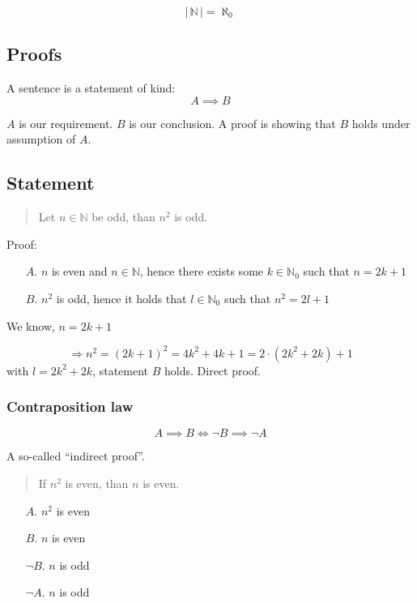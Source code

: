 \documentclass[a4paper,landscape,twocolumn]{article}
\newcommand\card[1]{\left|\,#1\,\right|}
\begin{document}
\[ \card{\mathbb{N}} = \aleph_0 \]

\subsection{Proofs}

A sentence is a statement of kind:
\[ A \implies B \]

$A$ is our requirement. $B$ is our conclusion.
A proof is showing that $B$ holds under assumption of $A$.

\subsection{Statement}

\begin{quote}
  Let $n \in \mathbb{N}$ be odd, than $n^2$ is odd.
\end{quote}

Proof:
\begin{itemize}
  \item[$A$.] $n$ is even and $n \in \mathbb{N}$, hence there exists some
           $k \in \mathbb{N}_0$ such that $n = 2k + 1$
  \item[$B$.] $n^2$ is odd, hence it holds that $l \in \mathbb{N}_0$ such that
           $n^2 = 2l + 1$
\end{itemize}

We know, $n = 2k + 1$

\[ \Rightarrow n^2 = (2k + 1)^2 = 4k^2 + 4k + 1 = 2\cdot(2k^2 + 2k) + 1 \]
with $l = 2k^2 + 2k$, statement $B$ holds. Direct proof.

\subsubsection{Contraposition law}

\[ A \implies B \Leftrightarrow \neg B \implies \neg A \]

A so-called \enquote{indirect proof}.

\begin{quote}
  If $n^2$ is even, than $n$ is even.
\end{quote}

\begin{itemize}
  \item[$A$.] $n^2$ is even
  \item[$B$.] $n$ is even
  \item[$\neg B$.] $n$ is odd
  \item[$\neg A$.] $n$ is odd
\end{itemize}
\end{document}
